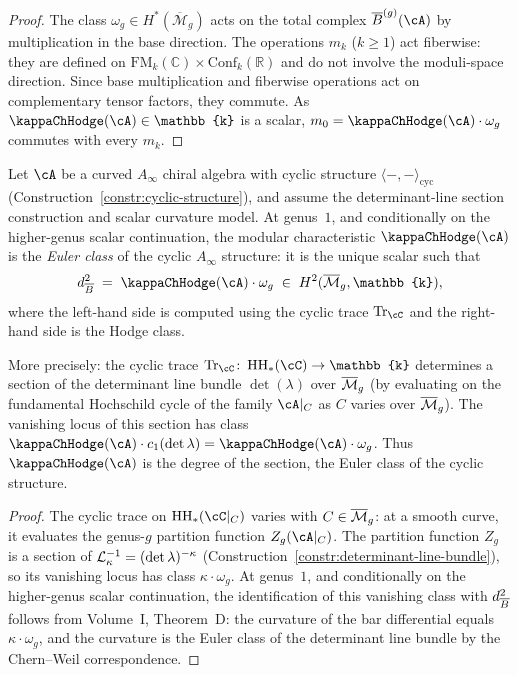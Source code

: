\begin{proof}
The class $\omega_g \in H^*(\overline{\mathcal M}_g)$ acts on the
total complex $\barB^{(g)}(\cA)$ by multiplication in the base
direction. The operations $m_k$ ($k \geq 1$) act fiberwise: they
are defined on $\mathrm{FM}_k(\mathbb{C}) \times
\mathrm{Conf}_k(\mathbb{R})$ and do not involve the moduli-space
direction. Since base multiplication and fiberwise operations act on
complementary tensor factors, they commute. As $\kappaChHodge(\cA) \in
\mathbb{k}$ is a scalar, $m_0 = \kappaChHodge(\cA) \cdot \omega_g$ commutes with
every $m_k$.
\end{proof}

\begin{proposition}
\label{prop:kappa-euler-class}
Let $\cA$ be a curved $A_\infty$ chiral algebra with cyclic structure
$\langle -, - \rangle_{\mathrm{cyc}}$
(Construction~\textup{\ref{constr:cyclic-structure}}), and assume the
determinant-line section construction and scalar curvature model. At
genus~$1$, and conditionally on the higher-genus scalar continuation,
the modular characteristic $\kappaChHodge(\cA)$ is the \emph{Euler class} of
the cyclic $A_\infty$ structure: it is the unique scalar such that
\[
d_{\barB}^2 \;=\; \kappaChHodge(\cA) \cdot \omega_g \;\in\; H^2(\overline{\cM}_g, \mathbb{k}),
\]
where the left-hand side is computed using the cyclic trace $\Tr_\cC$ and the right-hand side is the Hodge class.

More precisely: the cyclic trace $\Tr_\cC \colon \HH_\ast(\cC) \to \mathbb{k}$ determines a section of the determinant line bundle $\det(\lambda)$ over $\overline{\mathcal M}_g$ (by evaluating on the fundamental Hochschild cycle of the family $\cA|_C$ as $C$ varies over $\overline{\mathcal M}_g$). The vanishing locus of this section has class $\kappaChHodge(\cA) \cdot c_1(\det\lambda) = \kappaChHodge(\cA) \cdot \omega_g$. Thus $\kappaChHodge(\cA)$ is the degree of the section, the Euler class of the cyclic structure.
\end{proposition}

\begin{proof}
The cyclic trace on $\HH_\ast(\cC|_C)$ varies with $C \in \overline{\mathcal M}_g$: at a smooth curve, it evaluates the genus-$g$ partition function $Z_g(\cA|_C)$. The partition function $Z_g$ is a section of $\mathcal L_\kappa^{-1} = (\det\lambda)^{-\kappa}$ (Construction~\ref{constr:determinant-line-bundle}), so its vanishing locus has class $\kappa \cdot \omega_g$. At genus~$1$, and conditionally on the higher-genus scalar continuation, the identification of this vanishing class with $d_{\overline{B}}^2$ follows from Volume~I, Theorem~D: the curvature of the bar differential equals $\kappa \cdot \omega_g$, and the curvature is the Euler class of the determinant line bundle by the Chern--Weil correspondence.
\end{proof}

